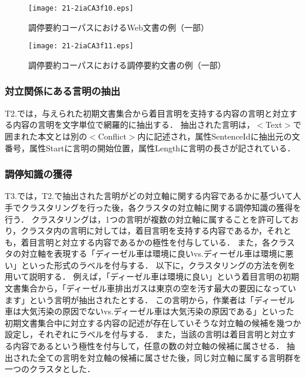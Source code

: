 \documentclass[japanese]{jnlp_1.4}
\begin{document}
\begin{figure}[p]
\begin{center}
\texttt{[image: 21-2iaCA3f10.eps]}
\end{center}
 \caption{調停要約コーパスにおけるWeb文書の例（一部）}
 \label{fg:MS_webdoc}
\end{figure}
\begin{figure}[p]
\begin{center}
\texttt{[image: 21-2iaCA3f11.eps]}
\end{center}
 \caption{調停要約コーパスにおける調停要約文書の例（一部）}
 \label{fg:MS_report}
\end{figure}


\subsubsection{対立関係にある言明の抽出}

T2.では，与えられた{初期}文書集合から着目言明を支持する内容の言明と対立する内容の言明を文字単位で網羅的に抽出する．
抽出された言明は，{\sf $<$Text$>$}で囲まれた本文とは別の{\sf $<$Conflict$>$}内に記述され，属性{\sf SentenceId}に抽出元の文番号，属性{\sf Start}に言明の開始位置，属性{\sf Length}に言明の長さが記されている．


\subsubsection{調停知識の獲得}

T3.では，T2.で抽出された言明がどの対立軸に関する内容であるかに基づいて人手でクラスタリングを行った後，各クラスタの対立軸に関する調停知識の獲得を行う．
クラスタリングは，1つの言明が複数の対立軸に属することを許可しており，クラスタ内の言明に対しては，着目言明を支持する内容であるか，それとも，着目言明と対立する内容であるかの極性を付与している．
また，各クラスタの対立軸を表現する「ディーゼル車は環境に良いvs.ディーゼル車は環境に悪い」といった形式のラベルを付与する．
以下に，クラスタリングの方法を例を用いて説明する．
例えば，「ディーゼル車は環境に良い」という着目言明の初期文書集合から，「ディーゼル車排出ガスは東京の空を汚す最大の要因になっています」という言明が抽出されたとする．
この言明から，作業者は「ディーゼル車は大気汚染の原因でないvs.ディーゼル車は大気汚染の原因である」といった初期文書集合中に対立する内容の記述が存在していそうな対立軸の候補を幾つか設定し，それぞれにラベルを付与する．
また，当該の言明は着目言明と対立する内容であるという極性を付与して，任意の数の対立軸の候補に属させる．
抽出された全ての言明を対立軸の候補に属させた後，同じ対立軸に属する言明群を一つのクラスタとした．
\end{document}
